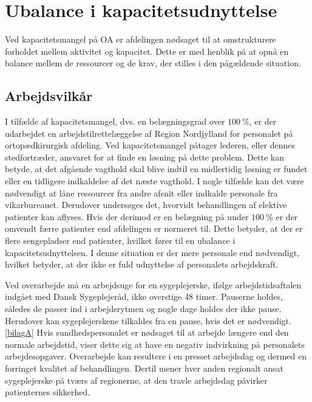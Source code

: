 \section{Ubalance i kapacitetsudnyttelse}
Ved kapacitetsmangel på OA er afdelingen nødsaget til at omstrukturere forholdet mellem aktivitet og kapacitet. Dette er med henblik på at opnå en balance mellem de ressourcer og de krav, der stilles i den pågældende situation.\cite{Bjerg2016} %

\subsection{Arbejdsvilkår} \label{Per_sik}

I tilfælde af kapacitetsmangel, dvs. en belægningsgrad over $100~\%$, er der udarbejdet en arbejdstilrettelæggelse af Region Nordjylland for personalet på ortopædkirurgisk afdeling. Ved kapacitetsmangel påtager lederen, eller dennes stedfortræder, ansvaret for at finde en løsning på dette problem. Dette kan betyde, at det afgående vagthold skal blive indtil en midlertidig løsning er fundet eller en tidligere indkaldelse af det næste vagthold. I nogle tilfælde kan det være nødvendigt at låne ressourcer fra andre afsnit eller indkalde personale fra vikarbureauet. Derudover undersøges det, hvorvidt behandlingen af elektive patienter kan aflyses.\cite{Bjerg2016} 
Hvis der derimod er en belægning på under $100~\%$ er der omvendt færre patienter end afdelingen er normeret til. Dette betyder, at der er flere sengepladser end patienter, hvilket fører til en ubalance i kapacitetsudnyttelsen. I denne situation er der mere personale end nødvendigt, hvilket betyder, at der ikke er fuld udnyttelse af personalets arbejdskraft. 

Ved overarbejde må en arbejdsuge for en sygeplejerske, ifølge arbejdstidsaftalen indgået med Dansk Sygeplejeråd, ikke overstige 48 timer\cite{Danske2015}. Pauserne holdes, således de passer ind i arbejdsrytmen og nogle dage holdes der ikke pause. Herudover kan sygeplejerskene tilkaldes fra en pause, hvis det er nødvendigt.\ref{bilagA} Hvis sundhedspersonalet er nødsaget til at arbejde længere end den normale arbejdstid, viser dette sig at have en negativ indvirkning på personalets arbejdesopgaver\cite{Dinges2004}. Overarbejde kan resultere i en presset arbejdsdag og dermed en forringet kvalitet af behandlingen\cite{Kjeldsen2015}. Dertil mener hver anden regionalt ansat sygeplejerske på tværs af regionerne, at den travle arbejdsdag påvirker patienternes sikkerhed\cite{Kjeldsen2015}.


